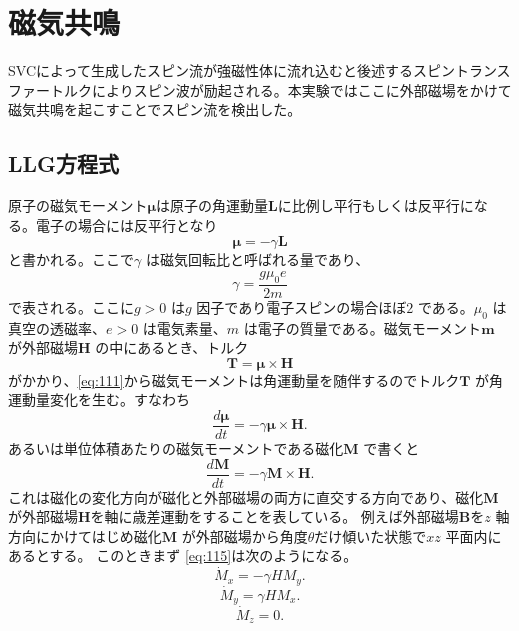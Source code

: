 \documentclass[dvipdfmx]{jsreport}
\numberwithin{equation}{chapter}
\numberwithin{table}{chapter}
\begin{document}
\section{磁気共鳴}
SVCによって生成したスピン流が強磁性体に流れ込むと後述するスピントランスファートルクによりスピン波が励起される。本実験ではここに外部磁場をかけて磁気共鳴を起こすことでスピン流を検出した。
\subsection{LLG方程式}
原子の磁気モーメント$\bm{\mu}$は原子の角運動量$\bm{L}$に比例し平行もしくは反平行になる。電子の場合には反平行となり
\begin{equation}
\label{eq:111}
	\bm{\mu}=-\gamma \bm{L}
\end{equation}
と書かれる。ここで$\gamma$ は磁気回転比と呼ばれる量であり、
\begin{equation}
\label{eq:112}
	\gamma=\frac{g\mu_0e}{2m}
\end{equation}
で表される。ここに$g>0$ は$g$ 因子であり電子スピンの場合ほぼ$2$ である。$\mu_0$ は真空の透磁率、$e>0$ は電気素量、$m$ は電子の質量である。磁気モーメント$\bm{m}$ が外部磁場$\bm{H}$ の中にあるとき、トルク
\begin{equation}
\label{eq:113}
	\bm{T}=\bm{\mu}\times \bm{H}
\end{equation}
がかかり、\eqref{eq:111}から磁気モーメントは角運動量を随伴するのでトルク$\bm{T}$ が角運動量変化を生む。すなわち
\begin{equation}
\label{eq:114}
	\frac{d \bm{\mu}}{dt}=-\gamma \bm{\mu}\times \bm{H}
.\end{equation}
あるいは単位体積あたりの磁気モーメントである磁化$\bm{M}$ で書くと
\begin{equation}
\label{eq:115}
	\frac{d \bm{M}}{dt}=-\gamma \bm{M}\times \bm{H}
.\end{equation}
これは磁化の変化方向が磁化と外部磁場の両方に直交する方向であり、磁化$\bm{M}$が外部磁場$\bm{H}$を軸に歳差運動をすることを表している。
例えば外部磁場$\bm{B}$を$z$ 軸方向にかけてはじめ磁化$\bm{M}$ が外部磁場から角度$\theta$だけ傾いた状態で$xz$ 平面内にあるとする。
このときまず
\eqref{eq:115}は次のようになる。
\begin{equation}
\label{eq:116}
	\dot{M}_x=-\gamma H M_y
.\end{equation}
\begin{equation}
\label{eq:117}
	\dot{M}_y=\gamma H M_x
.\end{equation}
\begin{equation}
\label{eq:118}
	\dot{M}_z=0
.\end{equation}
\end{document}
